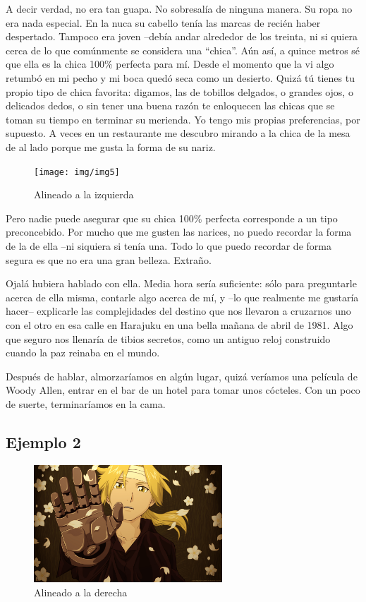 \documentclass[letterpaper]{article}
\begin{document}
	A decir verdad, no era tan guapa. No sobresalía de ninguna manera. Su ropa no era nada especial. En la nuca su cabello tenía las marcas de recién haber despertado. Tampoco era joven –debía andar alrededor de los treinta, ni si quiera cerca de lo que comúnmente se considera una “chica”. Aún así, a quince metros sé que ella es la chica 100\% perfecta para mí. Desde el momento que la vi algo retumbó en mi pecho y mi boca quedó seca como un desierto. Quizá tú tienes tu propio tipo de chica favorita: digamos, las de tobillos delgados, o grandes ojos, o delicados dedos, o sin tener una buena razón te enloquecen las chicas que se toman su tiempo en terminar su merienda. Yo tengo mis propias preferencias, por supuesto. A veces en un restaurante me descubro mirando a la chica de la mesa de al lado porque me gusta la forma de su nariz.
	
	\begin{figure}
		\centering
		\texttt{[image: img/img5]}
		\caption{Alineado a la izquierda}
	\end{figure}

Pero nadie puede asegurar que su chica 100\% perfecta corresponde a un tipo preconcebido. Por mucho que me gusten las narices, no puedo recordar la forma de la de ella –ni siquiera si tenía una. Todo lo que puedo recordar de forma segura es que no era una gran belleza. Extraño.

Ojalá hubiera hablado con ella. Media hora sería suficiente: sólo para preguntarle acerca de ella misma, contarle algo acerca de mí, y –lo que realmente me gustaría hacer– explicarle las complejidades del destino que nos llevaron a cruzarnos uno con el otro en esa calle en Harajuku en una bella mañana de abril de 1981. Algo que seguro nos llenaría de tibios secretos, como un antiguo reloj construido cuando la paz reinaba en el mundo.

Después de hablar, almorzaríamos en algún lugar, quizá veríamos una película de Woody Allen, entrar en el bar de un hotel para tomar unos cócteles. Con un poco de suerte, terminaríamos en la cama.

	\subsection{Ejemplo 2}
	\begin{figure}
		\centering
		\includegraphics[width=200pt]{img/img6}
		\caption{Alineado a la derecha}
	\end{figure}
	
\end{document}
